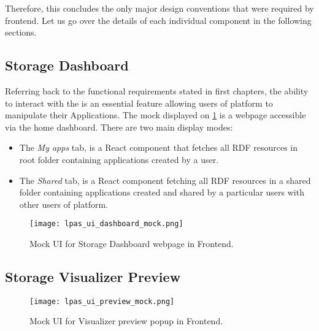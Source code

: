 Therefore, this concludes the only major design conventions that were required by \lpa{} frontend. Let us go over the details of each individual component in the following sections.

\subsection{Storage Dashboard}

Referring back to the functional requirements stated in first chapters, the ability to interact with the \lpas{} is an essential feature allowing users of \lpa{} platform to manipulate their Applications. The mock displayed on \ref{fig:lpas_ui_dashboard_mock} is a webpage accessible via the home dashboard. There are two main display modes:

\begin{itemize}
	\item The \textit{My apps} tab, is a React component that fetches all RDF resources in root \lpas{} folder containing applications created by a user. 
	\item The \textit{Shared} tab, is a React component fetching all RDF resources in a shared \lpas{} folder containing applications created and shared by a particular users with other users of \lpas{} platform.
\end{itemize}


\begin{figure}[h]
\centering
\texttt{[image: lpas\_ui\_dashboard\_mock.png]}
\caption{Mock UI for Storage Dashboard webpage in \lpa{} Frontend.}
\label{fig:lpas_ui_dashboard_mock}
\end{figure}

\subsection{Storage Visualizer Preview}


\begin{figure}[h]
\centering
\texttt{[image: lpas\_ui\_preview\_mock.png]}
\caption{Mock UI for Visualizer preview popup in \lpa{} Frontend.}
\label{fig:lpas_ui_preview_mock}
\end{figure}
